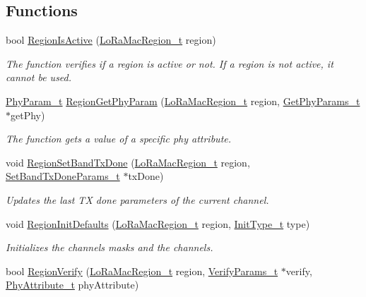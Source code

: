 \subsection*{Functions}
\begin{DoxyCompactItemize}
\item 
bool \hyperlink{group__REGION_ga3e5cf2322f71f8f9973718024b6fb782}{Region\+Is\+Active} (\hyperlink{group__LORAMAC_ga80c48efda9ae02e14b58160d34a798dd}{Lo\+Ra\+Mac\+Region\+\_\+t} region)
\begin{DoxyCompactList}\small\item\em The function verifies if a region is active or not. If a region is not active, it cannot be used. \end{DoxyCompactList}\item 
\hyperlink{group__REGION_gaed159b26e5c4677236b6e8677019db30}{Phy\+Param\+\_\+t} \hyperlink{group__REGION_gafbd084611ba512035a6cbe7f3aa5857b}{Region\+Get\+Phy\+Param} (\hyperlink{group__LORAMAC_ga80c48efda9ae02e14b58160d34a798dd}{Lo\+Ra\+Mac\+Region\+\_\+t} region, \hyperlink{group__REGION_gab471483fff904f4f89bbc03f7fc380ab}{Get\+Phy\+Params\+\_\+t} $\ast$get\+Phy)
\begin{DoxyCompactList}\small\item\em The function gets a value of a specific phy attribute. \end{DoxyCompactList}\item 
void \hyperlink{group__REGION_gabdd176dcf0b7e7900377b4c1e183613d}{Region\+Set\+Band\+Tx\+Done} (\hyperlink{group__LORAMAC_ga80c48efda9ae02e14b58160d34a798dd}{Lo\+Ra\+Mac\+Region\+\_\+t} region, \hyperlink{group__REGION_gad0524aa0673c0814a71e7a4f9cade3fc}{Set\+Band\+Tx\+Done\+Params\+\_\+t} $\ast$tx\+Done)
\begin{DoxyCompactList}\small\item\em Updates the last TX done parameters of the current channel. \end{DoxyCompactList}\item 
void \hyperlink{group__REGION_ga54b1b27a8431cd146b4dc33a894ee6db}{Region\+Init\+Defaults} (\hyperlink{group__LORAMAC_ga80c48efda9ae02e14b58160d34a798dd}{Lo\+Ra\+Mac\+Region\+\_\+t} region, \hyperlink{group__REGION_gaddc73ae10673ec925724e7870363bda9}{Init\+Type\+\_\+t} type)
\begin{DoxyCompactList}\small\item\em Initializes the channels masks and the channels. \end{DoxyCompactList}\item 
bool \hyperlink{group__REGION_ga7c1ff626bc1131889fa8de3197a1093a}{Region\+Verify} (\hyperlink{group__LORAMAC_ga80c48efda9ae02e14b58160d34a798dd}{Lo\+Ra\+Mac\+Region\+\_\+t} region, \hyperlink{group__REGION_ga966d97bc2f25df1c09e92e60ef652276}{Verify\+Params\+\_\+t} $\ast$verify, \hyperlink{group__REGION_ga9445b07fdf77581ecfaf389970e635f8}{Phy\+Attribute\+\_\+t} phy\+Attribute)

\end{DoxyCompactItemize}
